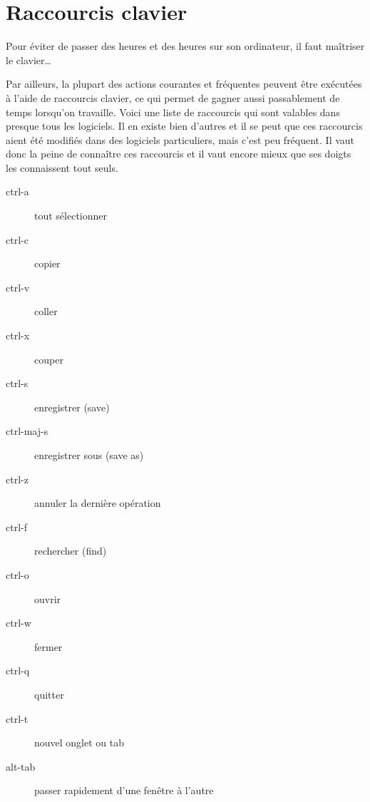 \documentclass[10pt,a4paper]{report}
\begin{document}
\newpage





\section{Raccourcis clavier}

Pour éviter de passer des heures et des heures sur son ordinateur, il faut maîtriser le clavier\dots


Par ailleurs, la plupart des actions courantes et fréquentes peuvent être exécutées à l'aide de raccourcis clavier, ce qui permet de gagner aussi passablement de temps lorsqu'on travaille. Voici une liste de raccourcis qui sont valables dans presque tous les logiciels. Il en existe bien d'autres et il se peut que ces raccourcis aient été modifiés dans des logiciels particuliers, mais c'est peu fréquent. Il vaut donc la peine de connaître ces raccourcis et il vaut encore mieux que ses doigts les connaissent tout seuls.


\begin{description}
	\item[ctrl-a] tout sélectionner
	\item[ctrl-c] copier
	\item[ctrl-v] coller
	\item[ctrl-x] couper
	\item[ctrl-s] enregistrer (save)
	\item[ctrl-maj-s] enregistrer sous (save as)
	\item[ctrl-z] annuler la dernière opération
	\item[ctrl-f] rechercher (find)
	\item[ctrl-o] ouvrir
	\item[ctrl-w] fermer
	\item[ctrl-q] quitter
	\item[ctrl-t] nouvel onglet ou tab
	\item[alt-tab] passer rapidement d'une fenêtre à l'autre
\end{description}
\end{document}
